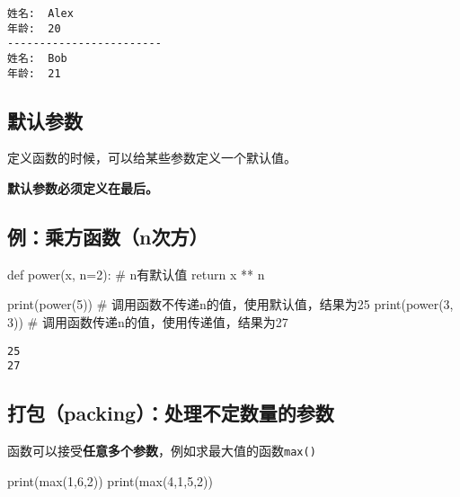 \documentclass[
  letterpaper,
  DIV=11,
  numbers=noendperiod]{scrreprt}
\newenvironment{Shaded}{\begin{snugshade}}{\end{snugshade}}
\newcommand{\BuiltInTok}[1]{\textcolor[rgb]{0.00,0.23,0.31}{#1}}
\newcommand{\CommentTok}[1]{\textcolor[rgb]{0.37,0.37,0.37}{#1}}
\newcommand{\ControlFlowTok}[1]{\textcolor[rgb]{0.00,0.23,0.31}{#1}}
\newcommand{\DecValTok}[1]{\textcolor[rgb]{0.68,0.00,0.00}{#1}}
\newcommand{\KeywordTok}[1]{\textcolor[rgb]{0.00,0.23,0.31}{#1}}
\newcommand{\NormalTok}[1]{\textcolor[rgb]{0.00,0.23,0.31}{#1}}
\newcommand{\OperatorTok}[1]{\textcolor[rgb]{0.37,0.37,0.37}{#1}}
\begin{document}
\begin{verbatim}
姓名:  Alex
年龄:  20
------------------------
姓名:  Bob
年龄:  21
\end{verbatim}

\hypertarget{ux9ed8ux8ba4ux53c2ux6570}{%
\subsection{默认参数}\label{ux9ed8ux8ba4ux53c2ux6570}}

定义函数的时候，可以给某些参数定义一个默认值。

\textbf{默认参数必须定义在最后。}

\hypertarget{ux4f8bux4e58ux65b9ux51fdux6570nux6b21ux65b9}{%
\subsection{例：乘方函数（n次方）}\label{ux4f8bux4e58ux65b9ux51fdux6570nux6b21ux65b9}}

\begin{Shaded}
\begin{Highlighting}[]
\KeywordTok{def}\NormalTok{ power(x, n}\OperatorTok{=}\DecValTok{2}\NormalTok{):  }\CommentTok{\# n有默认值}
    \ControlFlowTok{return}\NormalTok{ x }\OperatorTok{**}\NormalTok{ n}

\BuiltInTok{print}\NormalTok{(power(}\DecValTok{5}\NormalTok{))  }\CommentTok{\# 调用函数不传递n的值，使用默认值，结果为25}
\BuiltInTok{print}\NormalTok{(power(}\DecValTok{3}\NormalTok{, }\DecValTok{3}\NormalTok{))  }\CommentTok{\# 调用函数传递n的值，使用传递值，结果为27}
\end{Highlighting}
\end{Shaded}

\begin{verbatim}
25
27
\end{verbatim}

\hypertarget{ux6253ux5305packingux5904ux7406ux4e0dux5b9aux6570ux91cfux7684ux53c2ux6570}{%
\subsection{打包（packing）：处理不定数量的参数}\label{ux6253ux5305packingux5904ux7406ux4e0dux5b9aux6570ux91cfux7684ux53c2ux6570}}

函数可以接受\textbf{任意多个参数}，例如求最大值的函数\texttt{max()}

\begin{Shaded}
\begin{Highlighting}[]
\BuiltInTok{print}\NormalTok{(}\BuiltInTok{max}\NormalTok{(}\DecValTok{1}\NormalTok{,}\DecValTok{6}\NormalTok{,}\DecValTok{2}\NormalTok{)) }
\BuiltInTok{print}\NormalTok{(}\BuiltInTok{max}\NormalTok{(}\DecValTok{4}\NormalTok{,}\DecValTok{1}\NormalTok{,}\DecValTok{5}\NormalTok{,}\DecValTok{2}\NormalTok{))}
\end{Highlighting}
\end{Shaded}
\end{document}
